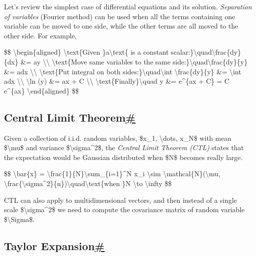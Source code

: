 Let's review the simplest case of differential equations and its solution. \emph{Separation of variables} (Fourier method) can be used when all the terms containing one variable can be moved to one side, while the other terms are all moved to the other side. For example,

\$\$ \textbackslash begin\{aligned\} \textbackslash text\{Given \}a\textbackslash text\{ is a constant scalar:\}\textbackslash quad\textbackslash frac\{dy\}\{dx\} \&= ay \textbackslash\textbackslash{} \textbackslash text\{Move same variables to the same side:\}\textbackslash quad\textbackslash frac\{dy\}\{y\} \&= adx \textbackslash\textbackslash{} \textbackslash text\{Put integral on both sides:\}\textbackslash quad\textbackslash int \textbackslash frac\{dy\}\{y\} \&= \textbackslash int adx \textbackslash\textbackslash{} \textbackslash ln (y) \&= ax + C\textquotesingle{} \textbackslash\textbackslash{} \textbackslash text\{Finally\}\textbackslash quad y \&= e\^{}\{ax + C\textquotesingle\} = C e\^{}\{ax\} \textbackslash end\{aligned\} \$\$

\subsection{\texorpdfstring{Central Limit Theorem\hyperref[central-limit-theorem]{\#}}{Central Limit Theorem\#}}\label{central-limit-theorem}

Given a collection of i.i.d. random variables, \$x\_1, \textbackslash dots, x\_N\$ with mean \$\textbackslash mu\$ and variance \$\textbackslash sigma\^{}2\$, the \emph{Central Limit Theorem (CTL)} states that the expectation would be Gaussian distributed when \$N\$ becomes really large.

\$\$ \textbackslash bar\{x\} = \textbackslash frac\{1\}\{N\}\textbackslash sum\_\{i=1\}\^{}N x\_i \textbackslash sim \textbackslash mathcal\{N\}(\textbackslash mu, \textbackslash frac\{\textbackslash sigma\^{}2\}\{n\})\textbackslash quad\textbackslash text\{when \}N \textbackslash to \textbackslash infty \$\$

CTL can also apply to multidimensional vectors, and then instead of a single scale \$\textbackslash sigma\^{}2\$ we need to compute the covariance matrix of random variable \$\textbackslash Sigma\$.

\subsection{\texorpdfstring{Taylor Expansion\hyperref[taylor-expansion]{\#}}{Taylor Expansion\#}}\label{taylor-expansion}


